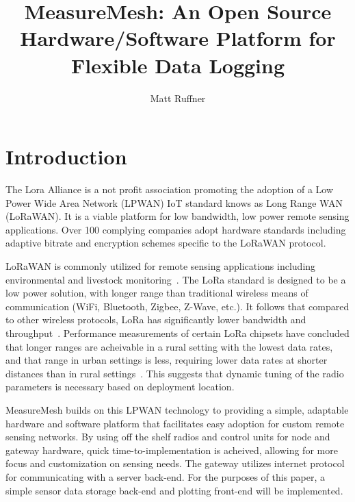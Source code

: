 \documentclass{IEEEtran}
\title{MeasureMesh: An Open Source Hardware/Software Platform for Flexible Data Logging}
\author{Matt Ruffner}
\date{}
\begin{document}
\maketitle




\section{Introduction}
 The Lora Alliance is a not profit association promoting the adoption of a Low Power Wide Area Network (LPWAN) IoT standard knows as Long Range WAN (LoRaWAN). It is a viable platform for low bandwidth, low power remote sensing applications. Over 100 complying companies adopt hardware standards including adaptive bitrate and encryption schemes specific to the LoRaWAN protocol.
 
LoRaWAN is commonly utilized for remote sensing applications including environmental and livestock monitoring~\cite{WuFan2018WAwI,IkhsanMukhammadGufron2018MLGf}. The LoRa standard is designed to be a low power solution, with longer range than traditional wireless means of communication (WiFi, Bluetooth, Zigbee, Z-Wave, etc.). It follows that compared to other wireless protocols, LoRa has significantly lower bandwidth and throughput~\cite{WuFan2018WAwI}. Performance measurements of certain LoRa chipsets have concluded that longer ranges are acheivable in a rural setting with the lowest data rates, and that range in urban settings is less, requiring lower data rates at shorter distances than in rural settings~\cite{RamonSanchez-Iborra2018PEoL}. This suggests that dynamic tuning of the radio parameters is necessary based on deployment location. 

MeasureMesh builds on this LPWAN technology to providing a simple, adaptable hardware and software platform that facilitates easy adoption for custom remote sensing networks. By using off the shelf radios and control units for node and gateway hardware, quick time-to-implementation is acheived, allowing for more focus and customization on sensing needs. The gateway utilizes internet protocol for communicating with a server back-end. For the purposes of this paper, a simple sensor data storage back-end and plotting front-end will be implemented.
\end{document}
